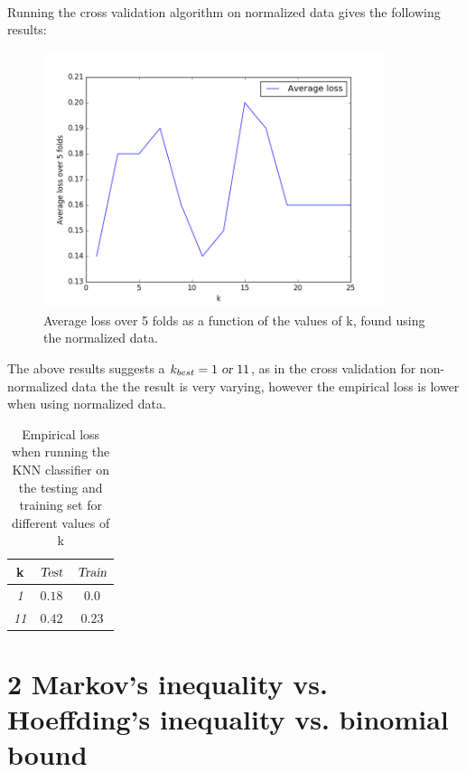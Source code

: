 \documentclass{article}
\begin{document}
\\
Running the cross validation algorithm on normalized data gives the following results:
\begin{figure}[H]
  \centering
  \includegraphics[width=10cm]{ass12.png}
  \caption{Average loss over 5 folds as a function of the values of k, found using the normalized data.}
  \label{fig:boat1}
\end{figure}
The above results suggests a $k_{best} = 1 \textsl{ or } 11$, as in the cross validation for non-normalized data the the result is very varying, however the empirical loss is lower when using normalized data.
\begin{table}[H]
  \centering
  \label{tab:table1}
  \begin{tabular}{c||c|c}
    \textsf{k} & $\textsl{Test}$ & $\textsl{Train}$\\
    \hline
    \textsl{1} & $0.18$ & $0.0$ \\
    \textsl{11} & $ 0.42 $ & $ 0.23 $ \\    
  \end{tabular}
  \caption{Empirical loss when running the KNN classifier on the testing and training set for different values of k} 
\end{table}
\section{2 Markov's inequality vs. Hoeffding's inequality vs. binomial bound}
\end{document}

